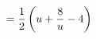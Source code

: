 \documentclass[preview]{standalone}
\begin{document}
\begin{align*}
\special{dvisvgm:raw <g id='unique000'>}=\frac{1}{2}\left(u+\frac{8}{u}-4\right)\special{dvisvgm:raw </g>}
\end{align*}
\end{document}
